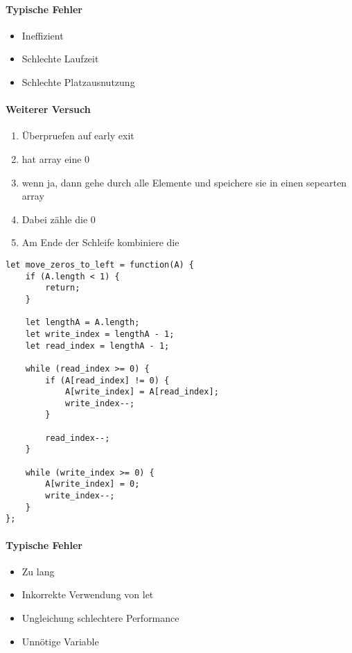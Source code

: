 \documentclass[babel]{book}
\begin{document}
\paragraph{Typische Fehler}
\begin{itemize} 
	\item Ineffizient
	\item Schlechte Laufzeit
	\item Schlechte Platzausnutzung
	
\end{itemize}

\paragraph{Weiterer Versuch}

\begin{enumerate} 
	\item Überpruefen auf early exit
	\item hat array eine 0
	\item wenn ja, dann gehe durch alle Elemente und speichere sie in einen sepearten array
	\item Dabei zähle die 0
	\item Am Ende der Schleife kombiniere die 
\end{enumerate}

\begin{lstlisting}[caption=My Javascript Example]
let move_zeros_to_left = function(A) {
	if (A.length < 1) {
		return;
	}

	let lengthA = A.length;
	let write_index = lengthA - 1;
	let read_index = lengthA - 1;

	while (read_index >= 0) {
		if (A[read_index] != 0) {
			A[write_index] = A[read_index];
			write_index--;
		}
	
		read_index--;
	}

	while (write_index >= 0) {
		A[write_index] = 0;
		write_index--;
	}
};
\end{lstlisting}

\paragraph{Typische Fehler}
\begin{itemize} 
	\item Zu lang
	\item Inkorrekte Verwendung von let
	\item Ungleichung schlechtere Performance
	\item Unnötige Variable
	
	
\end{itemize}
\end{document}
